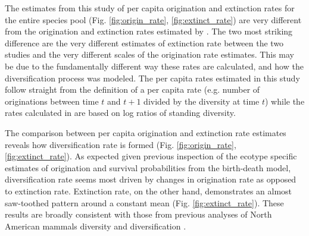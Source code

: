 \documentclass[12pt,letterpaper]{article}
\begin{document}
The estimates from this study of per capita origination and extinction rates for the entire species pool (Fig. \ref{fig:origin_rate}, \ref{fig:extinct_rate}) are very different from the origination and extinction rates estimated by \citet{Alroy2009}. The two most striking difference are the very different estimates of extinction rate between the two studies and the very different scales of the origination rate estimates. This may be due to the fundamentally different way these rates are calculated, and how the diversification process was modeled. The per capita rates estimated in this study follow straight from the definition of a per capita rate (e.g. number of originations between time \(t\) and \(t + 1\) divided by the diversity at time \(t\)) while the rates calculated in \citet{Alroy2009} are based on log ratios of standing diversity.

The comparison between per capita origination and extinction rate estimates reveals how diversification rate is formed (Fig. \ref{fig:origin_rate}, \ref{fig:extinct_rate}). As expected given previous inspection of the ecotype specific estimates of origination and survival probabilities from the birth-death model, diversification rate seems most driven by changes in origination rate as opposed to extinction rate. Extinction rate, on the other hand, demonstrates an almost saw-toothed pattern around a constant mean (Fig. \ref{fig:extinct_rate}). These results are broadly consistent with those from previous analyses of North American mammals diversity and diversification \citep{Alroy1996a,Alroy2000g,Alroy2009}.
\end{document}
